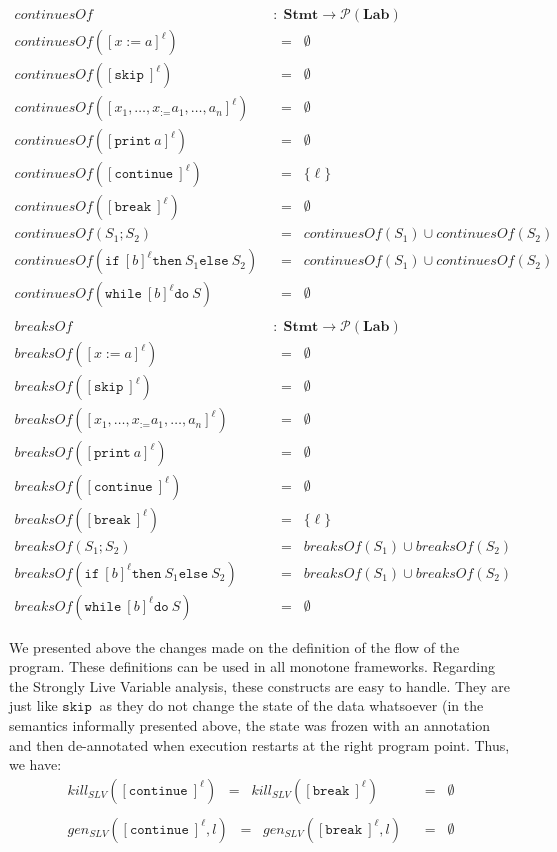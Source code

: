 \documentclass[a4wide,12pt]{article}
\def\eq{\;\; = \;\;}
\def\pset#1{\mathcal{P}(#1)}
\def\Stmt {\mathbf{Stmt}}
\def\Lab {\mathbf{Lab}}
\def\skip {\texttt{skip}\ }
\def\while{\texttt{while}\ }
\def\do {\texttt{do}\ }
\def\ifl {\texttt{if}\ }
\def\thenl {\texttt{then}\ }
\def\elsel {\texttt{else}\ }
\def\print{\texttt{print}\ }
\def\cont {\texttt{continue}\ }
\def\breakc{\texttt{break}\ }
\begin{document}
\begin{align*}
continuesOf & \; : \; \Stmt \to \pset{\Lab} \\
continuesOf([x:=a]^\ell) & \eq \emptyset \\
continuesOf([\skip]^\ell) & \eq \emptyset \\
continuesOf([x_1,\ldots,x_:=a_1,\ldots,a_n]^\ell) & \eq \emptyset \\
continuesOf([\print a]^\ell) & \eq \emptyset \\
continuesOf([\cont]^\ell) & \eq \{\ell\} \\
continuesOf([\breakc]^\ell) & \eq \emptyset \\
continuesOf(S_1;S_2) & \eq continuesOf(S_1) \cup continuesOf(S_2) \\
continuesOf(\ifl [b]^\ell \thenl S_1 \elsel S_2) & \eq continuesOf(S_1) \cup continuesOf(S_2) \\
continuesOf(\while [b]^\ell \do S) & \eq \emptyset \\
\\
breaksOf & \; : \; \Stmt \to \pset{\Lab} \\
breaksOf([x:=a]^\ell) & \eq \emptyset \\
breaksOf([\skip]^\ell) & \eq \emptyset \\
breaksOf([x_1,\ldots,x_:=a_1,\ldots,a_n]^\ell) & \eq \emptyset \\
breaksOf([\print a]^\ell) & \eq \emptyset \\
breaksOf([\cont]^\ell) & \eq \emptyset \\
breaksOf([\breakc]^\ell) & \eq \{\ell\} \\
breaksOf(S_1;S_2) & \eq breaksOf(S_1) \cup breaksOf(S_2) \\
breaksOf(\ifl [b]^\ell \thenl S_1 \elsel S_2) & \eq breaksOf(S_1) \cup breaksOf(S_2) \\
breaksOf(\while [b]^\ell \do S) & \eq \emptyset
\end{align*}
 
We presented above the changes made on the definition of the flow of the program.
These definitions can be used in all monotone frameworks. Regarding
the Strongly Live Variable analysis, these constructs are easy to handle. They
are just like $\skip$ as they do not change the state of the data whatsoever (in the
semantics informally presented above, the state was frozen with an annotation and then de-annotated
when execution restarts at the right program point. Thus, we have:
\begin{align*}
kill_{SLV}([\cont]^\ell) \eq kill_{SLV}([\breakc]^\ell) & \eq \emptyset \\
\\
gen_{SLV} ([\cont]^\ell,l) \eq gen_{SLV} ([\breakc]^\ell,l) & \eq \emptyset
\end{align*}
 
\end{document}
